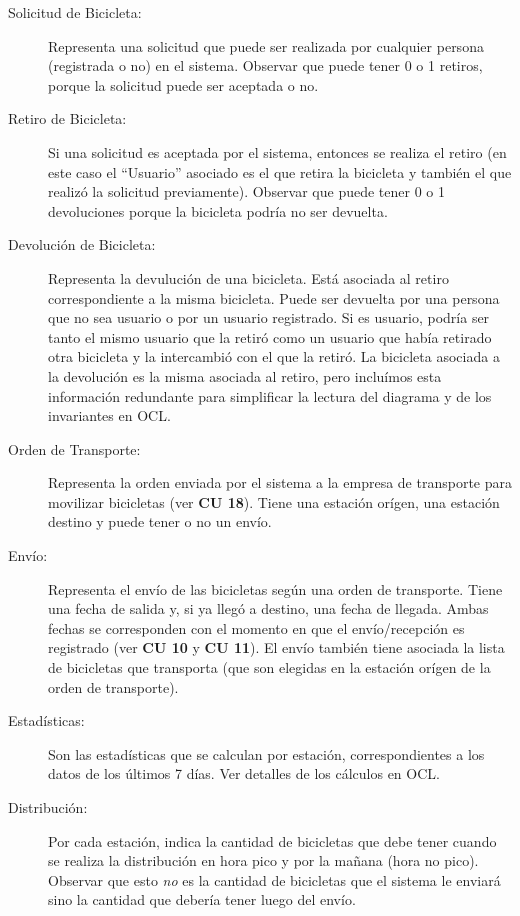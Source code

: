 \documentclass[a4paper, 10pt, twoside]{article}
\begin{document}
\begin{description}
  \item[Solicitud de Bicicleta:] Representa una solicitud que puede ser realizada por cualquier persona (registrada o no) en el sistema. Observar que puede tener 0 o 1 retiros, porque la solicitud puede ser aceptada o no.

  \item[Retiro de Bicicleta:] Si una solicitud es aceptada por el sistema, entonces se realiza el retiro (en este caso el ``Usuario'' asociado es el que retira la bicicleta y también el que realizó la solicitud previamente). Observar que puede tener 0 o 1 devoluciones porque la bicicleta podría no ser devuelta.

  \item[Devolución de Bicicleta:] Representa la devulución de una bicicleta. Está asociada al retiro correspondiente a la misma bicicleta. Puede ser devuelta por una persona que no sea usuario o por un usuario registrado. Si es usuario, podría ser tanto el mismo usuario que la retiró como un usuario que había retirado otra bicicleta y la intercambió con el que la retiró. La bicicleta asociada a la devolución es la misma asociada al retiro, pero incluímos esta información redundante para simplificar la lectura del diagrama y de los invariantes en OCL.

  \item[Orden de Transporte:] Representa la orden enviada por el sistema a la empresa de transporte para movilizar bicicletas (ver {\bf CU 18}). Tiene una estación orígen, una estación destino y puede tener o no un envío.

  \item[Envío:] Representa el envío de las bicicletas según una orden de transporte. Tiene una fecha de salida y, si ya llegó a destino, una fecha de llegada. Ambas fechas se corresponden con el momento en que el envío/recepción es registrado (ver {\bf CU 10} y {\bf CU 11}). El envío también tiene asociada la lista de bicicletas que transporta (que son elegidas en la estación orígen de la orden de transporte).

  \item[Estadísticas:] Son las estadísticas que se calculan por estación, correspondientes a los datos de los últimos 7 días. Ver detalles de los cálculos en OCL.

  \item[Distribución:] Por cada estación, indica la cantidad de bicicletas que debe tener cuando se realiza la distribución en hora pico y por la mañana (hora no pico). Observar que esto \emph{no} es la cantidad de bicicletas que el sistema le enviará sino la cantidad que debería tener luego del envío.
\end{description}
\end{document}

